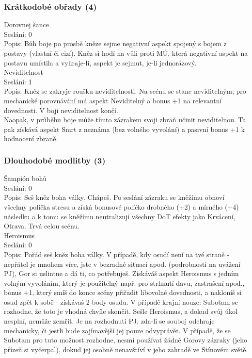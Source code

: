 \subsubsection{Krátkodobé obřady (4)}


Dorovnej šance\\
Seslání: 0 \\
Popis: Bůh boje po prosbě kněze sejme negativní aspekt spojený s bojem z postavy (vlastní či cizí).  Kněz si hodí na vůli proti MÚ, která negativní aspekt na postavu umístila a vyhraje-li, aspekt je sejmut, je-li jednorázový. \\


Neviditelnost\\
Seslání: 1\\
Popis: Kněz se zakryje roušku neviditelnosti. Na scénu se stane neviditelným; pro mechanické porovnávání má aspekt Neviditelný a bonus +1 na relevantní dovednosti. V boji neviditelnost končí. \\
Naopak, v průběhu boje může tímto zázrakem svoji zbraň učinit neviditelnou. Ta pak získává aspekt Smrt z neznáma (bez volného vyvolání) a pasivní bonus +1 k hodnocení zbraně.\\


\subsubsection{Dlouhodobé modlitby (3)}


Šampión bohů\\
Seslání: 0\\
Popis: Seš kněz boha války. Chápeš. Po seslání zázraku se kněžímu obnoví všechny políčka stresu a získá bonusové políčko drobného (+2) a mírného (+4) následku a k tomu se kněžímu neutralizují všechny DoT efekty jako Krvácení, Otrava. Trvá celou scénu.\\

Heroismus\\
Seslání: 0\\
Popis: Pořád seš kněz boha války. V případě, kdy osudí není na tvé straně - nepřátel je mnohem více, jste v bezradné situaci apod. (podrobnosti na uvážení PJ), Gor si uslintne a dá ti, co potřebuješ.  Získáváš aspekt Heroismus s jedním volným vyvoláním, který je použitelný např. pro strhnutí davu, zastrašení apod., bonus +1, který smíš do konce scény přiřadit libovolné dovednosti, a nakloníš si osud zpět k sobě - získávaš 2 body osudu. 
	V případě krajní nouze: Subotam se rozhodne, že toto je vhodná chvíle skončit. Sešle Heroismus, a dokud svůj úkol nesplní, nemůže zemřít. Je na rozhodnutí PJ, zda-li se souboj odehraje mechanicky, či jestli bude zajímavější jej pouze odvyprávět. V případě, že se Subotam pro tuto možnost rozhodne, nesmí používat žádné Gorovy zázraky (jeho přízeň si vyčerpal), dokud jej osobně nenavštíví v jeho zahradě ve Stínovém světě.\\

